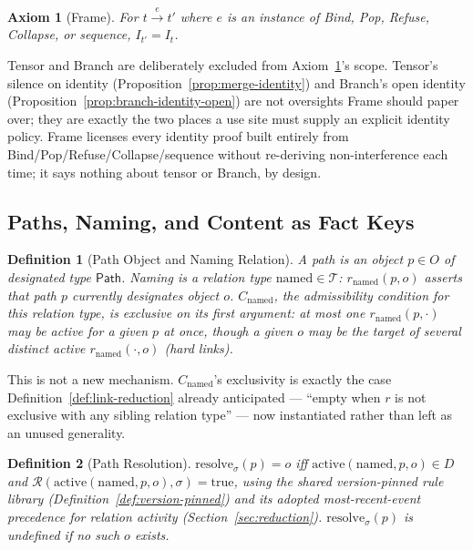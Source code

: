 \documentclass[11pt]{article}
\newtheorem{definition}{Definition}[section]
\newtheorem{axiom}{Axiom}[section]
\begin{document}
\begin{axiom}[Frame]
\label{ax:frame}
For $t \xrightarrow{e} t'$ where $e$ is an instance of Bind, Pop, Refuse, Collapse, or sequence, $I_{t'} = I_t$.
\end{axiom}

Tensor and Branch are deliberately excluded from Axiom~\ref{ax:frame}'s scope. Tensor's silence on identity (Proposition~\ref{prop:merge-identity}) and Branch's open identity (Proposition~\ref{prop:branch-identity-open}) are not oversights Frame should paper over; they are exactly the two places a use site must supply an explicit identity policy. Frame licenses every identity proof built entirely from Bind/Pop/Refuse/Collapse/sequence without re-deriving non-interference each time; it says nothing about tensor or Branch, by design.

\subsection{Paths, Naming, and Content as Fact Keys}

\begin{definition}[Path Object and Naming Relation]
\label{def:path-object}
A path is an object $p \in O$ of designated type $\mathsf{Path}$. Naming is a relation type $\mathrm{named} \in \mathcal{T}$: $r_{\mathrm{named}}(p,o)$ asserts that path $p$ currently designates object $o$. $C_{\mathrm{named}}$, the admissibility condition for this relation type, is exclusive on its first argument: at most one $r_{\mathrm{named}}(p,\cdot)$ may be active for a given $p$ at once, though a given $o$ may be the target of several distinct active $r_{\mathrm{named}}(\cdot,o)$ (hard links).
\end{definition}

This is not a new mechanism. $C_{\mathrm{named}}$'s exclusivity is exactly the case Definition~\ref{def:link-reduction} already anticipated --- ``empty when $r$ is not exclusive with any sibling relation type'' --- now instantiated rather than left as an unused generality.

\begin{definition}[Path Resolution]
\label{def:path-resolution}
$\mathrm{resolve}_\sigma(p) = o$ iff $\mathrm{active}(\mathrm{named},p,o) \in D$ and $\mathcal{R}(\mathrm{active}(\mathrm{named},p,o),\sigma) = \mathrm{true}$, using the shared version-pinned rule library (Definition~\ref{def:version-pinned}) and its adopted most-recent-event precedence for relation activity (Section~\ref{sec:reduction}). $\mathrm{resolve}_\sigma(p)$ is undefined if no such $o$ exists.
\end{definition}
\end{document}

